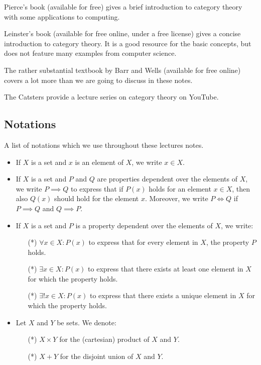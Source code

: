 \documentclass[a4paper,10pt]{scrartcl}
\theoremstyle{plain}
\theoremstyle{definition}
\begin{document}
Pierce's book \cite{pierce} (available for free) gives a brief introduction to category theory with some applications to computing.

Leinster's book \cite{leinster} (available for free online, under a free license) gives a concise introduction to category theory.
It is a good resource for the basic concepts, but does not feature many examples from computer science.

The rather substantial textbook by Barr and Wells \cite{barr-wells} (available for free online) covers a lot more than we are going to discuss in these notes.

The Catsters \cite{catsters} provide a lecture series on category theory on YouTube.



\subsection{Notations}
\label{sec:notation}

A list of notations which we use throughout these lectures notes.
\begin{itemize}
\item If $X$ is a set and $x$ is an element of $X$, we write $x \in X$.
\item If $X$ is a set and $P$ and $Q$ are properties dependent over the elements of $X$, we write $P\implies Q$ to express that if $P(x)$ holds for an element $x\in X$, then also $Q(x)$ should hold for the element $x$. Moreover, we write $P \iff Q$ if $P\implies Q$ and $Q\implies P$.
\item If $X$ is a set and $P$ is a property dependent over the elements of $X$, we write:
\begin{itemize}
\item[(*)] $\forall x\in X: P(x)$ to express that for every element in $X$, the property $P$ holds.
\item[(*)] $\exists x\in X: P(x)$ to express that there exists at least one element in $X$ for which the property holds.
\item[(*)] $\exists! x\in X: P(x)$ to express that there exists a unique element in $X$ for which the property holds.
\end{itemize}
\item Let $X$ and $Y$ be sets. We denote:
\begin{itemize}
\item[(*)] $X\times Y$ for the (cartesian) product of $X$ and $Y$.
\item[(*)] $X + Y$ for the disjoint union of $X$ and $Y$.
\end{itemize}
\end{itemize}
\end{document}
